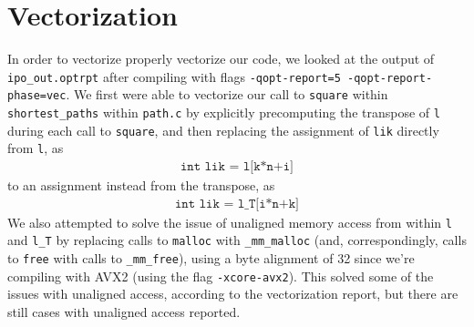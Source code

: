 \section{Vectorization}\label{sec:vector}
In order to vectorize properly vectorize our code, we looked at the output of \texttt{ipo\_out.optrpt} after compiling with flags \texttt{-qopt-report=5 -qopt-report-phase=vec}. We first were able to vectorize our call to \texttt{square} within \texttt{shortest\_paths} within \texttt{path.c} by explicitly precomputing the transpose of \texttt{l} during each call to \texttt{square}, and then replacing the assignment of \texttt{lik} directly from \texttt{l}, as
\begin{gather*}
\texttt{int lik = l[k*n+i]}
\end{gather*}
to an assignment instead from the transpose, as
\begin{gather*}
\texttt{int lik = l\_T[i*n+k]}
\end{gather*}
We also attempted to solve the issue of unaligned memory access from within \texttt{l} and \texttt{l\_T} by replacing calls to \texttt{malloc} with \texttt{\_mm\_malloc} (and, correspondingly, calls to \texttt{free} with calls to \texttt{\_mm\_free}), using a byte alignment of 32 since we're compiling with AVX2 (using the flag \texttt{-xcore-avx2}). This solved some of the issues with unaligned access, according to the vectorization report, but there are still cases with unaligned access reported.

